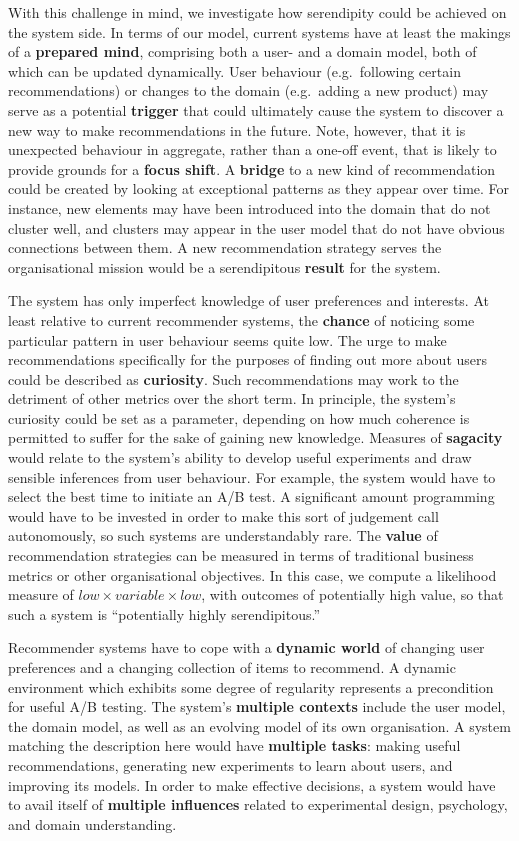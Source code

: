 With this challenge in mind, we investigate how serendipity could be achieved on the system side. In terms of our model, current systems have at least the makings of a \textbf{prepared mind}, comprising both a user- and a domain model, both of which can be updated dynamically.  User behaviour (e.g.~following certain recommendations) or changes to the domain (e.g.~adding a new product) may serve as a potential \textbf{trigger} that could ultimately cause the system to discover a new way to make recommendations in the future.  Note, however, that it is unexpected behaviour in aggregate, rather than a one-off event, that is likely to provide grounds for a \textbf{focus shift}.   A \textbf{bridge} to a new kind of recommendation could be created by looking at exceptional patterns as they appear over time.  For instance, new elements may have been introduced into the domain that do not cluster well, and clusters may appear in the user model that do not have obvious connections between them.  A new recommendation strategy serves the organisational mission would be a serendipitous \textbf{result} for the system.

The system has only imperfect knowledge of user preferences and
interests.  At least relative to current recommender systems, the
\textbf{chance} of noticing some particular pattern in user behaviour
seems quite low.  The urge to make recommendations specifically for
the purposes of finding out more about users could be described as
\textbf{curiosity}.  Such recommendations may work to the detriment of
other metrics over the short term.  In principle, the system's
curiosity could be set as a parameter, depending on how much coherence
is permitted to suffer for the sake of gaining new knowledge.
Measures of \textbf{sagacity} would relate to the system's ability to
develop useful experiments and draw sensible inferences from user
behaviour.  For example, the system would have to select the best time
to initiate an A/B test.  A significant amount programming would have
to be invested in order to make this sort of judgement call
autonomously, so such systems are understandably rare.  The
\textbf{value} of recommendation strategies can be measured in terms
of traditional business metrics or other organisational objectives.
In this case, we compute a likelihood measure of
$\mathit{low}\times\mathit{variable}\times\mathit{low}$, with outcomes
of potentially high value, so that such a system is ``potentially
highly serendipitous.''

Recommender systems have to cope with a \textbf{dynamic world} of changing user preferences and a changing collection of items to recommend.  A dynamic environment which exhibits some degree of regularity represents a precondition for useful A/B testing.  The system's \textbf{multiple contexts} include the user model, the domain model, as well as an evolving model of its own organisation.  A system matching the description here would have \textbf{multiple tasks}: making useful recommendations, generating new experiments to learn about users, and improving its models.  In order to make effective decisions, a system would have to avail itself of \textbf{multiple influences} related to experimental design, psychology, and domain understanding.

